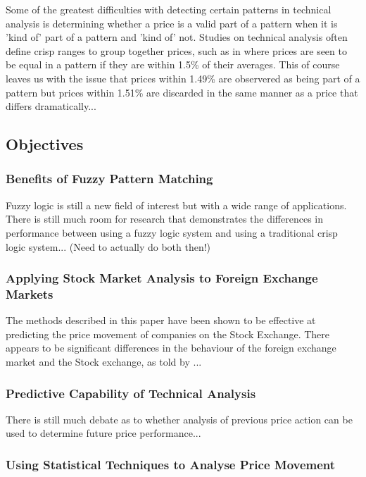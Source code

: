 \documentclass{article}
\begin{document}
Some of the greatest difficulties with detecting certain patterns in technical analysis is determining whether a price is a valid part of a pattern when it is 'kind of' part of a pattern and 'kind of' not. Studies on technical analysis often define crisp ranges to group together prices, such as in \citep{foundations} where prices are seen to be equal in a pattern if they are within 1.5\% of their averages. This of course leaves us with the issue that prices within 1.49\% are observered as being part of a pattern but prices within 1.51\% are discarded in the same manner as a price that differs dramatically...

\subsection{Objectives}

\subsubsection{Benefits of Fuzzy Pattern Matching}

Fuzzy logic is still a new field of interest but with a wide range of applications. There is still much room for research that demonstrates the differences in performance between using a fuzzy logic system and using a traditional crisp logic system... (Need to actually do both then!)

\subsubsection{Applying Stock Market Analysis to Foreign Exchange Markets}

The methods described in this paper have been shown to be effective at predicting the price movement of companies on the Stock Exchange. There appears to be significant differences in the behaviour of the foreign exchange market and the Stock exchange, as told by ...

\subsubsection{Predictive Capability of Technical Analysis}

There is still much debate as to whether analysis of previous price action can be used to determine future price performance...

\subsubsection{Using Statistical Techniques to Analyse Price Movement}
\end{document}
